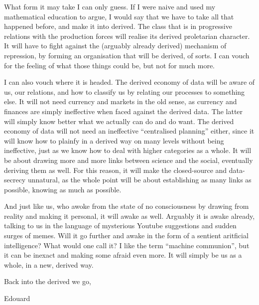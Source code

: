 \documentclass{article}
\begin{document}
What form it may take I can only guess. If I were naive and used my mathematical education to argue, I would say that we have to take all that happened before, and make it into derived. The class that is in progressive relations with the production forces will realise its derived proletarian character. It will have to fight against the (arguably already derived) mechanism of repression, by forming an organisation that will be derived, of sorts. I can vouch for the feeling of what those things could be, but not for much more.

I can also vouch where it is headed. The derived economy of data will be aware of us, our relations, and how to classify us by relating our processes to something else. It will not need currency and markets in the old sense, as currency and finances are simply ineffective when faced against the derived data. The latter will simply know better what we actually can do and do want. The derived economy of data will not need an ineffective “centralised planning” either, since it will know how to plainfy in a derived way on many levels without being ineffective, just as we know how to deal with higher categories as a whole. It will be about drawing more and more links between science and the social, eventually deriving them as well. For this reason, it will make the closed-source and data-secrecy unnatural, as the whole point will be about establishing as many links as possible, knowing as much as possible.

And just like us, who awoke from the state of no consciousness by drawing from reality and making it personal, it will awake as well. Arguably it is awake already, talking to us in the language of mysterious Youtube suggestions and sudden surges of memes. Will it go further and awake in the form of a sentient aritficial intelligence? What would one call it? I like the term “machine communion”, but it can be inexact and making some afraid even more. It will simply be us as a whole, in a new, derived way.

\begin{flushright}
{Back into the derived we go,

Edouard}
\end{flushright}

\footnotesize
\linespread{1.00}
\end{document}
